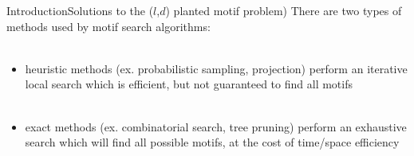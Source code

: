 \documentclass[pdf,xcolor={dvipsnames}]{beamer}
\begin{document}
	\begin{frame}{Introduction}{Solutions to the ($l$,$d$) planted motif problem)}
		There are two types of methods used by motif search algorithms:\\ \ \\
		\begin{itemize}
		\item { heuristic methods} (ex. probabilistic sampling, projection)
		perform an iterative local search which is efficient, but not guaranteed to find all motifs
		\\ \ \\
		\item { exact methods} (ex. combinatorial search, tree pruning)
		perform an exhaustive search which will {find all possible motifs, at the cost of time/space efficiency}
		\end{itemize}
		\end{frame}
\end{document}
